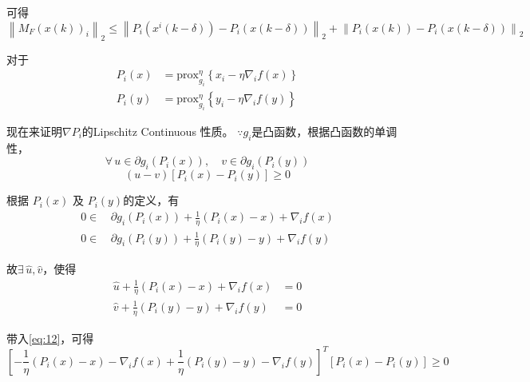 \documentclass{ctexart}
\begin{document}
可得
\begin{equation}\label{eq:9}
  \left\| M_F \left(x\left(k\right)\right)_i \right\|_2 \leq \left\| P_i \left(x^i \left(k-\delta\right)\right) - P_i \left(x\left(k-\delta\right)\right) \right\|_2 + \left\| P_i \left(x\left(k\right)\right) -  P_i \left(x\left(k-\delta\right)\right)\right\|_2
\end{equation}

对于
\begin{align}\label{eq:10}
  P_i \left(x\right) & = \text{prox}_{g_i}^\eta \left\{ x_i - \eta \nabla_i f\left(x\right) \right\} \\
  P_i \left(y\right) & = \text{prox}_{g_i}^\eta \left\{ y_i - \eta \nabla_i f\left(y\right) \right\}
\end{align}

现在来证明$\nabla P_i$的Lipschitz Continuous 性质。
$\because g_i$是凸函数，根据凸函数的单调性，
\begin{equation}\label{eq:11}
  \forall \, u\in \partial g_i \left(P_i \left(x\right)\right),\quad v\in \partial g_i \left(P_i \left(y\right)\right)
\end{equation}
\begin{equation}\label{eq:12}
  \left( u-v \right)\left[ P_i \left(x\right) - P_i \left(y\right) \right] \geq 0
\end{equation}

根据 $P_i \left(x\right)$ 及 $ P_i \left(y\right)$的定义，有
\begin{align}\label{eq:a1}
  0 \in \, & \partial g_i \left(P_i \left(x\right)\right) + \frac{1}{\eta}\left(P_i \left(x\right)-x \right) +\nabla_i f\left(x\right) \\
  0 \in \, & \partial g_i \left(P_i \left(y\right)\right) + \frac{1}{\eta}\left(P_i \left(y\right)-y \right) +\nabla_i f\left(y\right)
\end{align}

故$\exists \, \hat{u}, \hat{v}$，使得
\begin{align}\label{eq:a2}
  \hat{u}+\frac{1}{\eta}\left(P_i \left(x\right) - x\right) +\nabla_i f\left(x\right) & = 0 \\
  \hat{v}+\frac{1}{\eta}\left(P_i \left(y\right) - y\right) +\nabla_i f\left(y\right) & = 0
\end{align}

带入\ref{eq:12}，可得
\begin{equation}\label{eq:an}
  \left[ -\frac{1}{\eta}\left( P_i \left(x\right) - x \right) - \nabla_i f\left(x\right) + \frac{1}{\eta} \left( P_i \left(y\right) - y \right) - \nabla_i f\left(y\right)\right]^{T}\left[ P_i \left(x\right) - P_i \left(y\right) \right] \geq 0
\end{equation}
\end{document}
